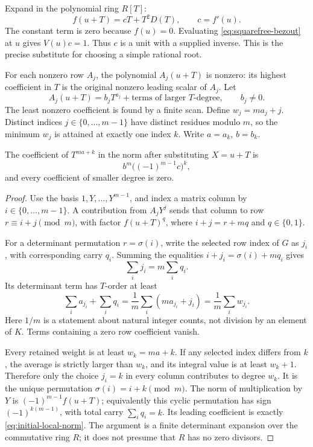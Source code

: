 Expand in the polynomial ring \(R[T]\):
\[
             f(u+T)=cT+T^2D(T),\qquad c=f'(u).
\]
The constant term is zero because \(f(u)=0\).  Evaluating
\eqref{eq:squarefree-bezout} at \(u\) gives
\(V(u)c=1\).  Thus \(c\) is a unit with a supplied inverse.
This is the precise substitute for choosing a simple rational root.

For each nonzero row \(A_j\), the polynomial \(A_j(u+T)\) is nonzero:
its highest coefficient in \(T\) is the original nonzero leading scalar
of \(A_j\).  Let
\[
 A_j(u+T)=b_jT^{a_j}+\text{terms of larger \(T\)-degree},
 \qquad b_j\ne0.
\]
The least nonzero coefficient is found by a finite scan.  Define
\(w_j=ma_j+j\).  Distinct indices \(j\in\{0,\ldots,m-1\}\) have
distinct residues modulo \(m\), so the minimum \(w_j\) is attained at
exactly one index \(k\).  Write \(a=a_k\), \(b=b_k\).

\begin{lemma}
\label{lem:local-norm-initial}
The coefficient of \(T^{ma+k}\) in the norm after substituting
\(X=u+T\) is
\begin{equation}
 \label{eq:initial-local-norm}
             b^m\bigl((-1)^{m-1}c\bigr)^k,
\end{equation}
and every coefficient of smaller degree is zero.
\end{lemma}

\begin{proof}
Use the basis \(1,Y,\ldots,Y^{m-1}\), and index a matrix column by
\(i\in\{0,\ldots,m-1\}\).  A contribution from \(A_jY^j\) sends
that column to row \(r\equiv i+j\pmod m\), with factor
\(f(u+T)^q\), where \(i+j=r+mq\) and \(q\in\{0,1\}\).

For a determinant permutation \(r=\sigma(i)\), write the selected row
index of \(G\) as \(j_i\), with corresponding carry \(q_i\).
Summing the equalities \(i+j_i=\sigma(i)+mq_i\) gives
\[
                  \sum_i j_i=m\sum_i q_i.
\]
Its determinant term has \(T\)-order at least
\[
 \sum_i a_{j_i}+\sum_iq_i
       =\frac1m\sum_i(ma_{j_i}+j_i)
       =\frac1m\sum_iw_{j_i}.
\]
Here \(1/m\) is a statement about natural integer counts, not division by
an element of \(K\).  Terms containing a zero row coefficient vanish.

Every retained weight is at least \(w_k=ma+k\).  If any selected index
differs from \(k\), the average is strictly larger than \(w_k\), and
its integral value is at least \(w_k+1\).  Therefore only the choice
\(j_i=k\) in every column contributes to degree \(w_k\).
It is the unique permutation \(\sigma(i)=i+k\pmod m\).
The norm of multiplication by \(Y\) is
\((-1)^{m-1}f(u+T)\); equivalently this cyclic permutation has sign
\((-1)^{k(m-1)}\), with total carry \(\sum_iq_i=k\).
Its leading coefficient is exactly \eqref{eq:initial-local-norm}.
The argument is a finite determinant expansion over the commutative ring
\(R\); it does not presume that \(R\) has no zero divisors.
\end{proof}

